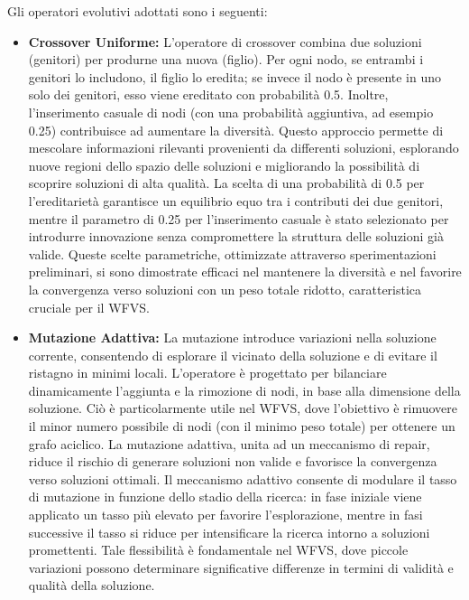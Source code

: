 \documentclass[12pt,a4paper,twoside]{article}
\begin{document}
Gli operatori evolutivi adottati sono i seguenti:
\begin{itemize}
    \item \textbf{Crossover Uniforme:} L'operatore di crossover combina due soluzioni (genitori) per produrne una nuova (figlio). Per ogni nodo, se entrambi i genitori lo includono, il figlio lo eredita; se invece il nodo è presente in uno solo dei genitori, esso viene ereditato con probabilità 0.5. Inoltre, l'inserimento casuale di nodi (con una probabilità aggiuntiva, ad esempio 0.25) contribuisce ad aumentare la diversità. Questo approccio permette di mescolare informazioni rilevanti provenienti da differenti soluzioni, esplorando nuove regioni dello spazio delle soluzioni e migliorando la possibilità di scoprire soluzioni di alta qualità.  
La scelta di una probabilità di 0.5 per l'ereditarietà garantisce un equilibrio equo tra i contributi dei due genitori, mentre il parametro di 0.25 per l'inserimento casuale è stato selezionato per introdurre innovazione senza compromettere la struttura delle soluzioni già valide. Queste scelte parametriche, ottimizzate attraverso sperimentazioni preliminari, si sono dimostrate efficaci nel mantenere la diversità e nel favorire la convergenza verso soluzioni con un peso totale ridotto, caratteristica cruciale per il WFVS.

\item \textbf{Mutazione Adattiva:} La mutazione introduce variazioni nella soluzione corrente, consentendo di esplorare il vicinato della soluzione e di evitare il ristagno in minimi locali. L'operatore è progettato per bilanciare dinamicamente l'aggiunta e la rimozione di nodi, in base alla dimensione della soluzione. Ciò è particolarmente utile nel WFVS, dove l'obiettivo è rimuovere il minor numero possibile di nodi (con il minimo peso totale) per ottenere un grafo aciclico. La mutazione adattiva, unita ad un meccanismo di repair, riduce il rischio di generare soluzioni non valide e favorisce la convergenza verso soluzioni ottimali.  
Il meccanismo adattivo consente di modulare il tasso di mutazione in funzione dello stadio della ricerca: in fase iniziale viene applicato un tasso più elevato per favorire l’esplorazione, mentre in fasi successive il tasso si riduce per intensificare la ricerca intorno a soluzioni promettenti. Tale flessibilità è fondamentale nel WFVS, dove piccole variazioni possono determinare significative differenze in termini di validità e qualità della soluzione.


\end{itemize}
\end{document}
